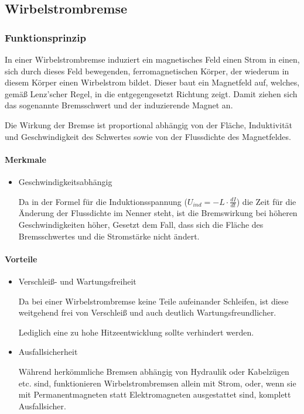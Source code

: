 

\subsection{Wirbelstrombremse}

\subsubsection{Funktionsprinzip}
In einer Wirbelstrombremse induziert ein magnetisches Feld einen Strom in einen, sich durch dieses Feld bewegenden, ferromagnetischen Körper, der wiederum in diesem Körper einen Wirbelstrom bildet. Dieser baut ein Magnetfeld auf, welches, gemäß Lenz'scher Regel, in die entgegengesetzt Richtung zeigt. Damit ziehen sich das sogenannte Bremsschwert und der induzierende Magnet an.

Die Wirkung der Bremse ist proportional abhängig von der Fläche, Induktivität und Geschwindigkeit des Schwertes sowie von der Flussdichte des Magnetfeldes.


\paragraph{Merkmale}

\begin{itemize}

	\item Geschwindigkeitsabhängig
	
Da in der Formel für die Induktionsspannung ($U_{ind}=-L \cdot \frac{dI}{dt}$) die Zeit für die Änderung der Flussdichte im Nenner steht, ist die Bremswirkung bei höheren Geschwindigkeiten höher, Gesetzt dem Fall, dass sich die Fläche des Bremsschwertes und die Stromstärke nicht ändert.

\end{itemize}


\paragraph{Vorteile}

\begin{itemize}
	\item Verschleiß- und Wartungsfreiheit
	
Da bei einer Wirbelstrombremse keine Teile aufeinander Schleifen, ist diese weitgehend frei von Verschleiß und auch deutlich Wartungsfreundlicher.

Lediglich eine zu hohe Hitzeentwicklung sollte verhindert werden.

	\item Ausfallsicherheit
	
Während herkömmliche Bremsen abhängig von Hydraulik oder Kabelzügen etc. sind, funktionieren Wirbelstrombremsen allein mit Strom, oder, wenn sie mit Permanentmagneten statt Elektromagneten ausgestattet sind, komplett Ausfallsicher.

\end{itemize}

